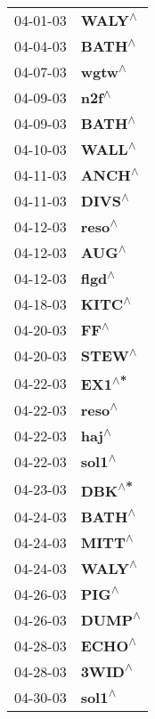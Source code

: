 \begin{supertabular}{p{0.08\textwidth}p{0.2\textwidth}}
 04-01-03 &    \textbf{WALY\textsuperscript{$\wedge$}} \\
 04-04-03 &    \textbf{BATH\textsuperscript{$\wedge$}} \\
 04-07-03 &    \textbf{wgtw\textsuperscript{$\wedge$}} \\
 04-09-03 &     \textbf{n2f\textsuperscript{$\wedge$}} \\
 04-09-03 &    \textbf{BATH\textsuperscript{$\wedge$}} \\
 04-10-03 &    \textbf{WALL\textsuperscript{$\wedge$}} \\
 04-11-03 &    \textbf{ANCH\textsuperscript{$\wedge$}} \\
 04-11-03 &    \textbf{DIVS\textsuperscript{$\wedge$}} \\
 04-12-03 &    \textbf{reso\textsuperscript{$\wedge$}} \\
 04-12-03 &     \textbf{AUG\textsuperscript{$\wedge$}} \\
 04-12-03 &    \textbf{flgd\textsuperscript{$\wedge$}} \\
 04-18-03 &    \textbf{KITC\textsuperscript{$\wedge$}} \\
 04-20-03 &      \textbf{FF\textsuperscript{$\wedge$}} \\
 04-20-03 &    \textbf{STEW\textsuperscript{$\wedge$}} \\
 04-22-03 &    \textbf{EX1\textsuperscript{$\wedge$*}} \\
 04-22-03 &    \textbf{reso\textsuperscript{$\wedge$}} \\
 04-22-03 &     \textbf{haj\textsuperscript{$\wedge$}} \\
 04-22-03 &    \textbf{sol1\textsuperscript{$\wedge$}} \\
 04-23-03 &    \textbf{DBK\textsuperscript{$\wedge$*}} \\
 04-24-03 &    \textbf{BATH\textsuperscript{$\wedge$}} \\
 04-24-03 &    \textbf{MITT\textsuperscript{$\wedge$}} \\
 04-24-03 &    \textbf{WALY\textsuperscript{$\wedge$}} \\
 04-26-03 &     \textbf{PIG\textsuperscript{$\wedge$}} \\
 04-26-03 &    \textbf{DUMP\textsuperscript{$\wedge$}} \\
 04-28-03 &    \textbf{ECHO\textsuperscript{$\wedge$}} \\
 04-28-03 &    \textbf{3WID\textsuperscript{$\wedge$}} \\
 04-30-03 &    \textbf{sol1\textsuperscript{$\wedge$}} \\

\end{supertabular}
